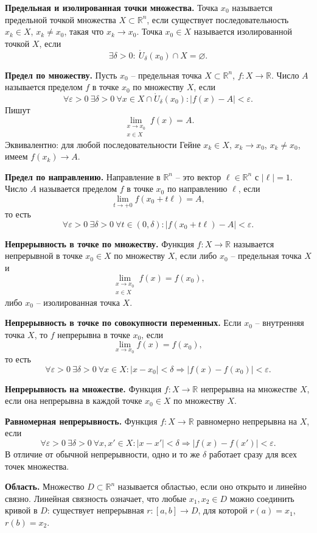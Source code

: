 \documentclass[12pt,a4paper]{article}
\newcommand{\R}{\mathbb{R}}
\newcommand{\eps}{\varepsilon}
\newcommand{\PBall}[2]{\mathring U_{#1}(#2)}
\newcommand{\limset}[2]{\lim_{\substack{#1\\ #2}}}
\begin{document}
\textbf{Предельная и изолированная точки множества.}
Точка \(x_0\) называется предельной точкой множества \(X\subset\R^n\), если
существует последовательность \(x_k\in X\), \(x_k\ne x_0\), такая что
\(x_k\to x_0\). Точка \(x_0\in X\) называется изолированной точкой \(X\), если
\[
  \exists\delta>0:\ \PBall{\delta}{x_0}\cap X=\varnothing.
\]

\textbf{Предел по множеству.}
Пусть \(x_0\) -- предельная точка \(X\subset\R^n\), \(f:X\to\R\). Число
\(A\) называется пределом \(f\) в точке \(x_0\) по множеству \(X\), если
\[
  \forall\eps>0\ \exists\delta>0\ \forall x\in X\cap\PBall{\delta}{x_0}:
  |f(x)-A|<\eps .
\]
Пишут
\[
  \limset{x\to x_0}{x\in X} f(x)=A.
\]
Эквивалентно: для любой последовательности Гейне \(x_k\in X\),
\(x_k\to x_0\), \(x_k\ne x_0\), имеем \(f(x_k)\to A\).

\textbf{Предел по направлению.}
Направление в \(\R^n\) -- это вектор \(\ell\in\R^n\) с \(|\ell|=1\). Число
\(A\) называется пределом \(f\) в точке \(x_0\) по направлению \(\ell\), если
\[
  \lim_{t\to +0} f(x_0+t\ell)=A,
\]
то есть
\[
  \forall\eps>0\ \exists\delta>0\ \forall t\in(0,\delta):
  |f(x_0+t\ell)-A|<\eps .
\]

\textbf{Непрерывность в точке по множеству.}
Функция \(f:X\to\R\) называется непрерывной в точке \(x_0\in X\) по множеству
\(X\), если либо \(x_0\) -- предельная точка \(X\) и
\[
  \limset{x\to x_0}{x\in X} f(x)=f(x_0),
\]
либо \(x_0\) -- изолированная точка \(X\).

\textbf{Непрерывность в точке по совокупности переменных.}
Если \(x_0\) -- внутренняя точка \(X\), то \(f\) непрерывна в точке \(x_0\),
если
\[
  \lim_{x\to x_0}f(x)=f(x_0),
\]
то есть
\[
  \forall\eps>0\ \exists\delta>0\ \forall x\in X:
  |x-x_0|<\delta \Rightarrow |f(x)-f(x_0)|<\eps .
\]

\textbf{Непрерывность на множестве.}
Функция \(f:X\to\R\) непрерывна на множестве \(X\), если она непрерывна в
каждой точке \(x_0\in X\) по множеству \(X\).

\textbf{Равномерная непрерывность.}
Функция \(f:X\to\R\) равномерно непрерывна на \(X\), если
\[
  \forall\eps>0\ \exists\delta>0\ \forall x,x'\in X:
  |x-x'|<\delta \Rightarrow |f(x)-f(x')|<\eps .
\]
В отличие от обычной непрерывности, одно и то же \(\delta\) работает сразу для
всех точек множества.

\textbf{Область.}
Множество \(D\subset\R^n\) называется областью, если оно открыто и линейно
связно. Линейная связность означает, что любые \(x_1,x_2\in D\) можно соединить
кривой в \(D\): существует непрерывная \(r:[a,b]\to D\), для которой
\(r(a)=x_1\), \(r(b)=x_2\).
\end{document}
